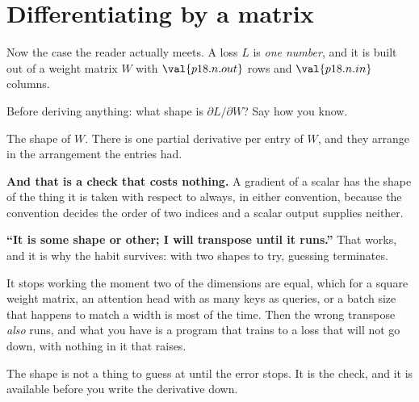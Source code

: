 \section{Differentiating by a matrix}
\label{sec:P18-by-a-matrix}

\begin{fr}
Now the case the reader actually meets. A loss $L$ is \emph{one number}, and
it is built out of a weight matrix $W$ with $\val{p18.n.out}$ rows and
$\val{p18.n.in}$ columns.

Before deriving anything: what shape is $\partial L / \partial W$? Say how you
know.
\dotline
\nextframe
\end{fr}

\begin{fr}
\begin{ansblock}
The shape of $W$. There is one partial derivative per entry of $W$, and they
arrange in the arrangement the entries had.
\end{ansblock}

\textbf{And that is a check that costs nothing.} A gradient of a scalar has
the shape of the thing it is taken with respect to \dash{} always, in either
convention, because the convention decides the order of two indices and a
scalar output supplies neither.

\end{fr}

\begin{fr}
\begin{trapbox}
\textbf{\enquote{It is some shape or other; I will transpose until it runs.}}
That works, and it is why the habit survives: with two shapes to try, guessing
terminates.

It stops working the moment two of the dimensions are equal, which for a
square weight matrix, an attention head with as many keys as queries, or a
batch size that happens to match a width is most of the time. Then the wrong
transpose \emph{also} runs, and what you have is a program that trains to a
loss that will not go down, with nothing in it that raises.

The shape is not a thing to guess at until the error stops. It is the check,
and it is available before you write the derivative down.
\end{trapbox}
\end{fr}


